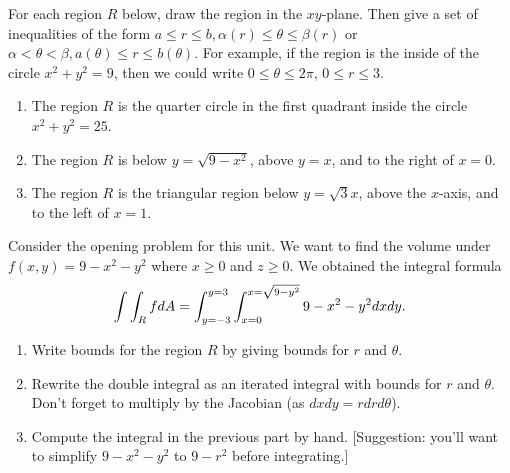 

\begin{problem}
For each region $R$ below, draw the region in the $xy$-plane. Then give a set of inequalities of the form $a\leq r\leq b, \alpha(r)\leq \theta \leq \beta(r)$ or $\alpha<\theta<\beta, a(\theta)\leq r\leq b(\theta)$. For example, if the region is the inside of the circle $x^2+y^2=9$, then we could write $0\leq \theta\leq 2\pi$, $0\leq r\leq 3$. 
\begin{enumerate}
 \item The region $R$ is the quarter circle in the first quadrant inside the circle $x^2+y^2=25$.
 \item The region $R$ is below $y=\sqrt{9-x^2}$, above $y=x$, and to the right of $x=0$.  
 \item The region $R$ is the triangular region below $y=\sqrt 3 x$, above the $x$-axis, and to the left of $x=1$. 
\end{enumerate}
\end{problem}


\begin{problem}
Consider the opening problem for this unit.  We want to find the volume under $f(x,y)=9-x^2-y^2$ where $x\geq0$ and $z\geq 0$.  We obtained the integral formula 
$$\int\int_R f dA = \displaystyle\int_{y=-3}^{y=3} \int_{x=0}^{x=\sqrt{9-y^2}}9-x^2-y^2 dx dy.$$
\begin{enumerate}
 \item Write bounds for the region $R$ by giving bounds for $r$ and $\theta$.
 \item Rewrite the double integral as an iterated integral with bounds for $r$ and $\theta$. Don't forget to multiply by the Jacobian (as $dxdy=rdrd\theta$). 
 \item Compute the integral in the previous part by hand. [Suggestion: you'll want to simplify $9-x^2-y^2$ to $9-r^2$ before integrating.]
\end{enumerate}
\end{problem}


